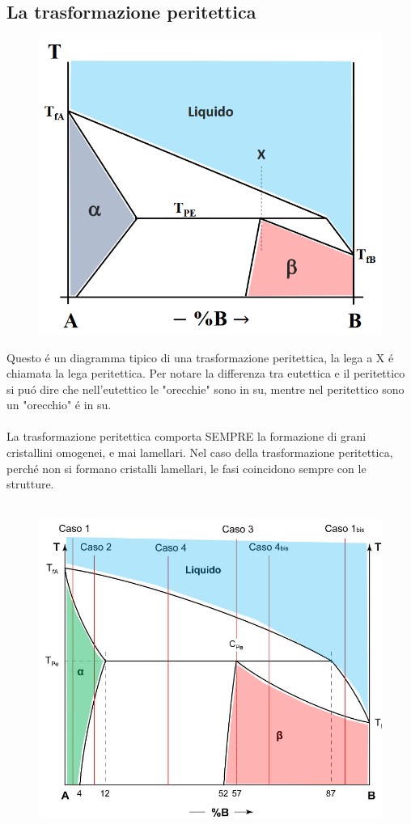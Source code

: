 \documentclass{article}
\begin{document}
{        \subsection{La trasformazione peritettica}
            \begin{figure}[h!]
                \centering
                \includegraphics[width=.85\linewidth]{Diagramma di stato per leghe peritettiche esemplari.png}
            \end{figure}
            Questo \'e un diagramma tipico di una trasformazione peritettica, la lega a X \'e chiamata la lega peritettica. Per notare la differenza tra eutettica e il peritettico si pu\'o dire che nell'eutettico le "orecchie" sono in su, mentre nel peritettico sono un "orecchio" \'e in su.\\ \\
            La trasformazione peritettica comporta SEMPRE la formazione di grani cristallini omogenei, e mai lamellari. Nel caso della trasformazione peritettica, perch\'e non si formano cristalli lamellari, le fasi coincidono sempre con le strutture.\\ \\
            \newpage
            \begin{figure}[h!]
                \centering
                \includegraphics[width=.85\linewidth]{Casi di leghe nei diagrammi di stato per leghe peritettiche.png}
            \end{figure}
}
\end{document}
